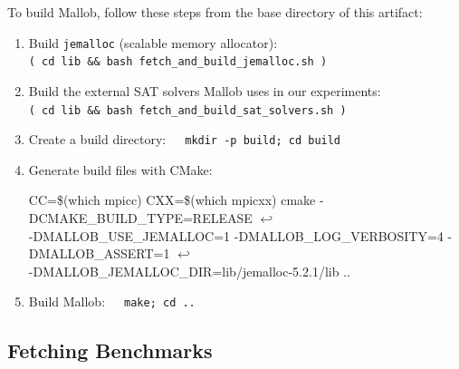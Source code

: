 \documentclass[runningheads]{article}
\newcommand{\CR}{{\tiny$\hookleftarrow$}}
\numberwithin{dummy}{subsection}
\begin{document}
To build Mallob, follow these steps from the base directory of this artifact:
\begin{enumerate}
 \item Build \texttt{jemalloc} (scalable memory allocator):\\
 \texttt{( cd lib \&\& bash fetch\_and\_build\_jemalloc.sh )}
 \item Build the external SAT solvers Mallob uses in our experiments:\\
 \texttt{( cd lib \&\& bash fetch\_and\_build\_sat\_solvers.sh )}
 \item Create a build directory:\ \ \ \texttt{mkdir -p build; cd build}
 \item Generate build files with CMake:
 \begin{ttfenv}
 CC=\$(which mpicc) CXX=\$(which mpicxx) cmake -DCMAKE\_BUILD\_TYPE=RELEASE \CR\\
 \hspace*{0.3cm}-DMALLOB\_USE\_JEMALLOC=1 -DMALLOB\_LOG\_VERBOSITY=4 -DMALLOB\_ASSERT=1 \CR\\
 \hspace*{0.3cm}-DMALLOB\_JEMALLOC\_DIR=lib/jemalloc-5.2.1/lib ..
 \end{ttfenv}
 \item Build Mallob:\ \ \ \texttt{make; cd ..}
\end{enumerate}

\subsection{Fetching Benchmarks}
\end{document}
